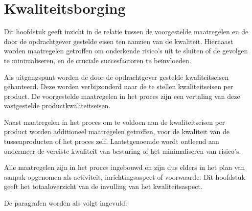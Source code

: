 \section{Kwaliteitsborging}
Dit hoofdstuk geeft inzicht in de relatie tussen de voorgestelde maatregelen
en de door de opdrachtgever gestelde eisen ten aanzien van de kwaliteit.
Hiernaast worden maatregelen getroffen om onderkende risico's uit te sluiten of de gevolgen te minimaliseren,
en de cruciale succesfactoren te be\"invloeden.

Als uitgangspunt worden de door de opdrachtgever gestelde kwaliteitseisen gehanteerd.
Deze worden verbijzonderd naar de te stellen kwaliteitseisen per product.
De voorgestelde maatregelen in het proces zijn een vertaling van deze vastgestelde productkwaliteitseisen.

Naast maatregelen in het proces om te voldoen aan de kwaliteitseisen per product worden additioneel maatregelen getroffen,
voor de kwaliteit van de tussenproducten of het proces zelf.
Laatstgenoemde wordt ontleend aan ondermeer de vereiste kwaliteit van besturing of het minimaliseren van risico's.

Alle maatregelen zijn in het proces ingebouwd en zijn dus elders in het plan van aanpak opgenomen als activiteit,
inrichtingsaspect of voorwaarde. Dit hoofdstuk geeft het totaaloverzicht van de invulling van het kwaliteitsaspect.

De paragrafen worden als volgt ingevuld:

